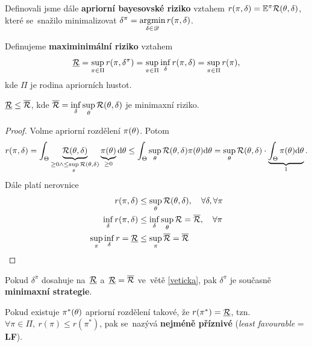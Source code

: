 Definovali jsme dále \textbf{apriorní bayesovské riziko} vztahem $r(\pi,\delta)=\mathbb{E}^\pi\mathcal{R}(\theta,\delta)$, které se~snažilo minimalizovat $\delta^{\pi}=\mathop{\mathrm{argmin}}\limits_{\delta\in\mathscr{D} }r(\pi,\delta)$.
\begin{define}
	Definujeme \textbf{maximinimální riziko} vztahem $$\underline{\mathcal{R}}=\sup\limits_{\pi\in\Pi} r(\pi,\delta^{\pi})=\sup\limits_{\pi\in\Pi}\inf\limits_{\delta} r(\pi,\delta)=\sup\limits_{\pi\in\Pi}r(\pi),$$ kde $\Pi$ je rodina apriorních hustot.
\end{define}
\begin{theorem}\label{veticka}
	$\underline{\mathcal{R}}\leq \overline{\mathcal{R}}$, kde $\overline{\mathcal{R}}=\inf\limits_\delta\sup\limits_\theta \mathcal{R}(\theta,\delta)$ je minimaxní riziko.
	\begin{proof}
		Volme apriorní rozdělení $\pi(\theta)$. Potom $$ r(\pi,\delta)=\int_\Theta\underbrace{\mathcal{R}(\theta,\delta)}_{\geq0\wedge\leq \sup\limits_{\theta}\mathcal{R}(\theta,\delta)}\underbrace{\pi(\theta)}_{\geq0}\mathrm{d}\theta\leq \int_{\Theta}\sup\limits_\theta \mathcal{R}(\theta,\delta)\pi(\theta)\mathrm{d}\theta=\sup\limits_\theta \mathcal{R}(\theta,\delta)\cdot \underbrace{\int_{\Theta}\pi(\theta)\mathrm{d}\theta}_{1}.$$
		Dále platí nerovnice \[
		\begin{split}
		r(\pi,\delta)&\leq \sup\limits_\theta\mathcal{R}(\theta,\delta),\quad \forall\delta,\forall\pi\\
		\inf\limits_\delta r(\pi,\delta)&\leq \inf\limits_\delta\sup\limits_\theta \mathcal{R} =\overline{\mathcal{R}},\quad \forall\pi\\
		\sup\limits_\pi\inf\limits_\delta r=\underline{\mathcal{R}}&\leq \sup\limits_{\pi}\overline{\mathcal{R}}=\overline{\mathcal{R}}
		\end{split}
		\]
	\end{proof}
\end{theorem}
\begin{remark}
	Pokud $\delta^\pi$ dosahuje na~$\underline{\mathcal{R}}$ a~$\underline{\mathcal{R}}=\overline{\mathcal{R}}$ ve~větě \ref{veticka}, pak $\delta^\pi$ je současně \textbf{minimaxní strategie}.
\end{remark}
\begin{define}
	Pokud existuje $\pi^\ast(\theta)$ apriorní rozdělení takové, že $r(\pi ^\ast)=\underline{\mathcal{R}}$, tzn. $\forall\pi\in\Pi,~r(\pi)\leq r(\pi^\ast)$, pak se~nazývá \textbf{nejméně příznivé} (\textit{least favourable} = \textbf{LF}).
\end{define}

